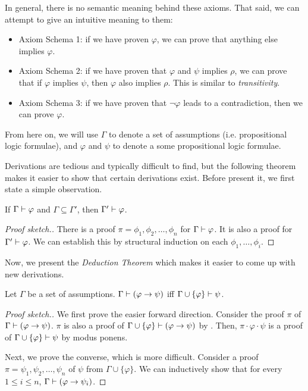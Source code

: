 \documentclass[11pt,usenames, dvipsnames]{article}
\begin{document}
In general, there is no semantic meaning behind these axioms. That said, we can attempt to give an intuitive meaning to them:
\begin{itemize}
  \item Axiom Schema 1: if we have proven $\varphi$, we can prove that anything else implies $\varphi$.
  \item Axiom Schema 2: if we have proven that $\varphi$ and $\psi$ implies $\rho$, we can prove that if $\varphi$ implies $\psi$, then $\varphi$ also implies $\rho$. This is similar to \emph{transitivity}.
  \item Axiom Schema 3: if we have proven that $\neg \varphi$ leads to a contradiction, then we can prove $\varphi$.
\end{itemize}

From here on, we will use $\Gamma$ to denote a set of assumptions (i.e. propositional logic formulae), and $\varphi$ and $\psi$ to denote a some propositional logic formulae.

Derivations are tedious and typically difficult to find, but the following theorem makes it easier to show that certain derivations exist. Before present it, we first state a simple observation.

\begin{claim}
  If $\Gamma \vdash \varphi$ and $\Gamma \subseteq \Gamma'$, then $\Gamma' \vdash \varphi$.
\end{claim}

\begin{proof}[Proof sketch.]
  There is a proof $\pi = \phi_1, \phi_2, \ldots, \phi_n$ for $\Gamma \vdash \varphi$. It is also a proof for $\Gamma' \vdash \varphi$. We can establish this by structural induction on each $\phi_1, \ldots, \phi_i$.
\end{proof}

Now, we present the \emph{Deduction Theorem} which makes it easier to come up with new derivations.

\begin{theorem}
  Let $\Gamma$ be a set of assumptions. $\Gamma \vdash (\varphi \to \psi)$ iff $\Gamma \cup \{\varphi\} \vdash \psi$.
\end{theorem}

\begin{proof}[Proof sketch.]
  We first prove the easier forward direction. Consider the proof $\pi$ of $\Gamma \vdash (\varphi \to \psi)$. $\pi$ is also a proof of $\Gamma \cup \{\varphi\} \vdash (\varphi \to \psi)$ by . Then, $\pi \cdot \varphi \cdot \psi$ is a proof of $\Gamma \cup \{\varphi\} \vdash \psi$ by modus ponens.

  Next, we prove the converse, which is more difficult. Consider a proof $\pi = \psi_1, \psi_2, \ldots, \psi_n$ of $\psi$ from $\Gamma \cup \{\varphi\}$. We can inductively show that for every $1 \le i \le n$, $\Gamma \vdash (\varphi \to \psi_i)$.
\end{proof}
\end{document}
